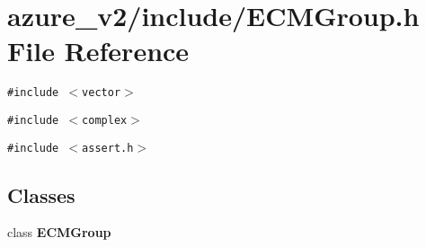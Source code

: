 \section{azure\_\-v2/include/ECMGroup.h File Reference}
\label{ECMGroup_8h}
{\tt \#include $<$vector$>$}\par
{\tt \#include $<$complex$>$}\par
{\tt \#include $<$assert.h$>$}\par
\subsection*{Classes}
\begin{CompactItemize}
\item 
class \bf{ECMGroup}
\end{CompactItemize}
